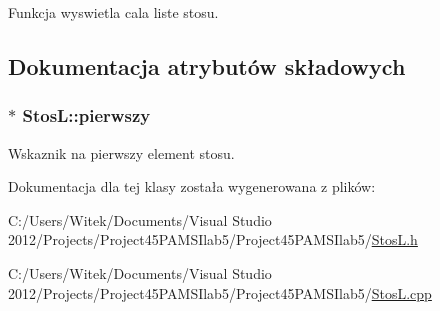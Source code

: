 Funkcja wyswietla cala liste stosu. 



\subsection{Dokumentacja atrybutów składowych}
\hypertarget{class_stos_l_a50de812f4b155571f88ea4ac6a0d5982}{
\subsubsection[{pierwszy}]{$\ast$ Stos\-L\-::pierwszy}}\label{class_stos_l_a50de812f4b155571f88ea4ac6a0d5982}


Wskaznik na pierwszy element stosu. 



Dokumentacja dla tej klasy została wygenerowana z plików\-:\begin{DoxyCompactItemize}
\item 
C\-:/\-Users/\-Witek/\-Documents/\-Visual Studio 2012/\-Projects/\-Project45\-P\-A\-M\-S\-Ilab5/\-Project45\-P\-A\-M\-S\-Ilab5/\hyperlink{_stos_l_8h}{Stos\-L.\-h}\item 
C\-:/\-Users/\-Witek/\-Documents/\-Visual Studio 2012/\-Projects/\-Project45\-P\-A\-M\-S\-Ilab5/\-Project45\-P\-A\-M\-S\-Ilab5/\hyperlink{_stos_l_8cpp}{Stos\-L.\-cpp}\end{DoxyCompactItemize}
